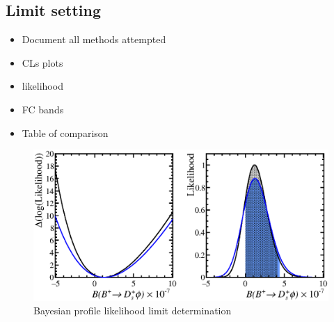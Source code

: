 {%
 
 


\subsection{Limit setting}
\label{sec:B2DsPhi_limitsetting}

{\color{Red}
\begin{itemize}
\item Document all methods attempted
\item CLs plots
\item likelihood
\item FC bands
\item Table of comparison 
\end{itemize}
}

\begin{figure}[!h]
    \centering
        \includegraphics[width=1.0\textwidth]{figs/B2DsPhi/Likelihood_limits.eps}
        \caption{Bayesian profile likelihood limit determination}
    \label{fig:limit_likelihood}   
\end{figure}

}
